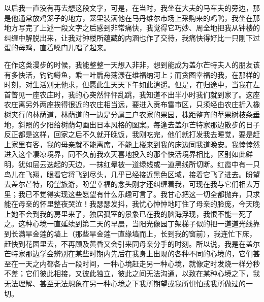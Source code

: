 \par 以后我一直没有再去想这段文字，可是，在当时，我坐在大夫的马车夫的旁边，那是他通常放鸡笼子的地方，笼里装满他在马丹维尔市场上采购来的鸡鸭，我坐在那地方写完了上述一段文字之后感到非常痛快，我觉得它巧妙、周全地把我从钟楼的纠缠中解脱出来，让我对钟楼所蕴藏的内涵也作了交待，我痛快得好比一只刚下过蛋的母鸡，直着嗓门儿唱了起来。
\par 在作这类漫步的时候，我能整整一天想入非非，想到能成为盖尔芒特夫人的朋友该有多快活，钓钓鳟鱼，乘一叶扁舟荡漾在维福纳河上；而贪图幸福的我，在那样的时刻，对生活别无他求，但愿此生天天下午如此逍遥。但是，在归途中，当我在左首瞥见一座农庄时，我的心突然怦怦乱跳，我知道不出半小时我们就到家了。这座农庄离另外两座挨得很近的农庄相当远，要进入贡布雷市区，只须经由农庄折入橡树夹行的林荫道，林荫道的一边是分属三户农家的果园，株距整齐的苹果树枝条垂地，斜照的夕阳给树荫勾画出日本风格的图案。每逢去盖尔芒特家那边散步的日子反正都是这样，回家之后不久就开晚饭，我刚吃完，他们就打发我去睡觉，要是赶上家里有客，我的母亲就不能离席，不能上楼来到我的床边同我道晚安。我悻悻然进入这个凄凉境界，同不久前我欢天喜地投入的那个快活境界相比，区别如此鲜明，犹如层云迭起的天边，一抹红晕被一道绿线或一道黑线所切断。红霞中有一只鸟儿在飞翔，眼看它将飞到尽头，几乎已经接近黑色区域，接着它飞了进去。盼望去盖尔芒特，盼望旅游，盼望幸福的念头刚才还纠缠着我，可现在我与它们相去万里；我已不觉得实现这些愿望有什么乐趣可言了。我甘心把这一切全都抛弃，只求能在母亲的怀里整夜哭泣！我瑟瑟发抖，我忧心忡忡地盯住了母亲的脸庞，今天晚上她不会到我的房里来了，独居孤室的景象已在我的脑海浮现，我恨不能一死了之。这种心境一直延续到第二天的早晨，当阳光像园丁架梯子似的把一道道光线靠到长满旱金莲的墙上（那些旱金莲一直缘墙而上，长到我的窗前），我连忙下床，赶快到花园里去，不再顾及黄昏又会引来同母亲分手的时刻。所以说，我是在盖尔芒特家那边学会辨别在某些时期内先后在我身上出现的各种不同的心境的，它们甚至在一天之内都各占一段时间，一种心境赶走另一种心境，就像定时发烧一样分秒不差；它们彼此相接，又彼此独立，彼此之间无法沟通，以致在某种心境之下，我无法理解、甚至无法想象在另一种心境之下我所期望或我所惧怕或我所做过的一切。
